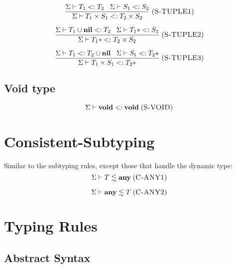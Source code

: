 \documentclass[12pt]{article}
\newcommand{\Any}{\mathbf{any}}
\newcommand{\Nil}{\mathbf{nil}}
\newcommand{\Void}{\mathbf{void}}
\newcommand{\mylabel}[1]{\; (\textsc{#1})}
\newcommand{\subtype}{<:}
\newcommand{\senv}{\Sigma}
\begin{document}
\[
\frac{\senv \vdash T_{1} \subtype T_{2} \;\;\;
      \senv \vdash S_{1} \subtype S_{2}}
     {\senv \vdash T_{1} \times S_{1} \subtype T_{2} \times S_{2}}
\mylabel{S-TUPLE1}
\]

\[
\frac{\senv \vdash T_{1} \cup \Nil \subtype T_{2} \;\;\;
      \senv \vdash T_{1}* \subtype S_{2}}
     {\senv \vdash T_{1}* \subtype T_{2} \times S_{2}}
\mylabel{S-TUPLE2}
\]

\[
\frac{\senv \vdash T_{1} \subtype T_{2} \cup \Nil \;\;\;
      \senv \vdash S_{1} \subtype T_{2}*}
     {\senv \vdash T_{1} \times S_{1} \subtype T_{2}*}
\mylabel{S-TUPLE3}
\]

\subsection{Void type}

\[
\senv \vdash \Void \subtype \Void
\mylabel{S-VOID}
\]

\section{Consistent-Subtyping}

Similar to the subtyping rules, except those that handle the dynamic type:
\[
\senv \vdash T \lesssim \Any
\mylabel{C-ANY1}
\]

\[
\senv \vdash \Any \lesssim T
\mylabel{C-ANY2}
\]

\section{Typing Rules}

\subsection{Abstract Syntax}
\end{document}
